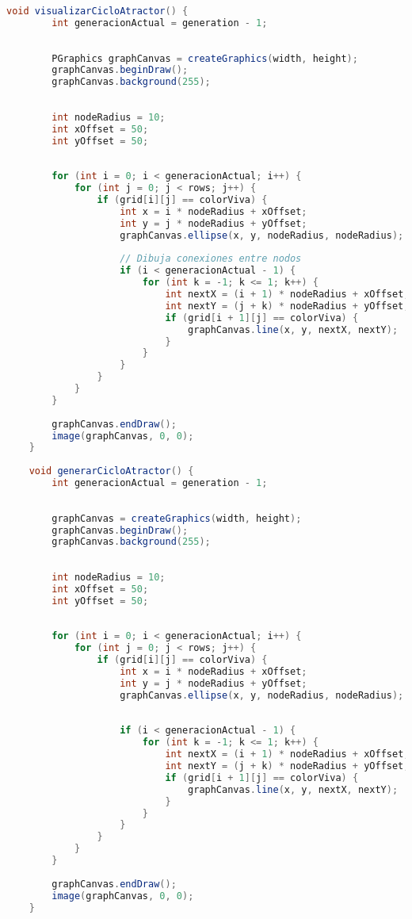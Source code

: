\documentclass{article}
\begin{document}
\begin{lstlisting}[language=Java, basicstyle=\tiny, breaklines=true, breakatwhitespace=true]
	void visualizarCicloAtractor() {
		int generacionActual = generation - 1;
		
	
		PGraphics graphCanvas = createGraphics(width, height);
		graphCanvas.beginDraw();
		graphCanvas.background(255);
		
		
		int nodeRadius = 10;
		int xOffset = 50;
		int yOffset = 50;
		
		
		for (int i = 0; i < generacionActual; i++) {
			for (int j = 0; j < rows; j++) {
				if (grid[i][j] == colorViva) {
					int x = i * nodeRadius + xOffset;
					int y = j * nodeRadius + yOffset;
					graphCanvas.ellipse(x, y, nodeRadius, nodeRadius);
					
					// Dibuja conexiones entre nodos
					if (i < generacionActual - 1) {
						for (int k = -1; k <= 1; k++) {
							int nextX = (i + 1) * nodeRadius + xOffset;
							int nextY = (j + k) * nodeRadius + yOffset;
							if (grid[i + 1][j] == colorViva) {
								graphCanvas.line(x, y, nextX, nextY);
							}
						}
					}
				}
			}
		}
		
		graphCanvas.endDraw();
		image(graphCanvas, 0, 0);
	}
	
	void generarCicloAtractor() {
		int generacionActual = generation - 1;
		
		
		graphCanvas = createGraphics(width, height);
		graphCanvas.beginDraw();
		graphCanvas.background(255);
		
		
		int nodeRadius = 10;
		int xOffset = 50;
		int yOffset = 50;
		
		
		for (int i = 0; i < generacionActual; i++) {
			for (int j = 0; j < rows; j++) {
				if (grid[i][j] == colorViva) {
					int x = i * nodeRadius + xOffset;
					int y = j * nodeRadius + yOffset;
					graphCanvas.ellipse(x, y, nodeRadius, nodeRadius);
					
					
					if (i < generacionActual - 1) {
						for (int k = -1; k <= 1; k++) {
							int nextX = (i + 1) * nodeRadius + xOffset;
							int nextY = (j + k) * nodeRadius + yOffset;
							if (grid[i + 1][j] == colorViva) {
								graphCanvas.line(x, y, nextX, nextY);
							}
						}
					}
				}
			}
		}
		
		graphCanvas.endDraw();
		image(graphCanvas, 0, 0);
	}
	\end{lstlisting}
	
\end{document}
